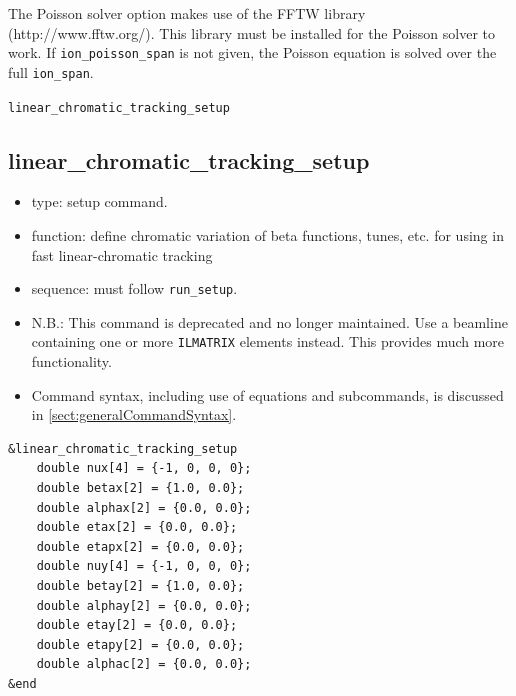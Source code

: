 \documentclass[11pt]{article}
\begin{document}
The Poisson solver option makes use of the FFTW library (http://www.fftw.org/).  This library must be installed for the Poisson solver to work.  If \verb|ion_poisson_span| is not given, the Poisson equation is solved over the full \verb|ion_span|.

\newpage
\begin{center}{\Large\verb|linear_chromatic_tracking_setup|}\end{center}
\subsection{linear\_chromatic\_tracking\_setup \label{subsec:linearchromatictrackingsetup}}

\begin{itemize}
\item type: setup command.
\item function: define chromatic variation of beta functions, tunes, etc. for using in
 fast linear-chromatic tracking
\item sequence: must follow \verb|run_setup|.
\item N.B.: This command is deprecated and no longer maintained. Use a beamline containing one or
  more \verb|ILMATRIX| elements instead. This provides much more functionality.
\item Command syntax, including use of equations and subcommands, is discussed in \ref{sect:generalCommandSyntax}.
\end{itemize}

\begin{verbatim}
&linear_chromatic_tracking_setup
    double nux[4] = {-1, 0, 0, 0};
    double betax[2] = {1.0, 0.0};
    double alphax[2] = {0.0, 0.0};
    double etax[2] = {0.0, 0.0};
    double etapx[2] = {0.0, 0.0};
    double nuy[4] = {-1, 0, 0, 0};
    double betay[2] = {1.0, 0.0};
    double alphay[2] = {0.0, 0.0};
    double etay[2] = {0.0, 0.0};
    double etapy[2] = {0.0, 0.0};
    double alphac[2] = {0.0, 0.0};
&end
\end{verbatim}
\end{document}
